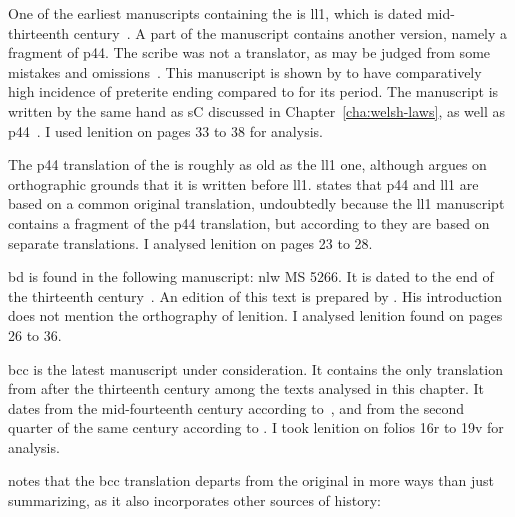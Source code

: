 One of the earliest manuscripts containing the  is \gls{ll1}, which
is dated mid-thirteenth century~\autocite[179]{huws_medieval_2000}.  A part of
the manuscript contains another version, namely a fragment
of \gls{p44}. The scribe was not a translator, as may be judged from
some mistakes and omissions~\autocite[xxxvii]{roberts_brut_1971}. This manuscript is shown by \textcite[80--81]{Rod_Datable98} to have comparatively high incidence of preterite ending  compared to  for its period.
The manuscript is written by the same hand as \gls{sC} discussed in Chapter~\ref{cha:welsh-laws}, as well as  \gls{p44}~\autocite[179]{huws_medieval_2000}.
I used lenition on pages 33 to 38 for analysis.

The \gls{p44} translation of the  is roughly as old as the \gls{ll1} one, although \textcite[85]{Rus_Orthography93} argues on orthographic grounds that it is written before \gls{ll1}. 
\Textcite[xix]{Lew_Brut42} states that \gls{p44} and \gls{ll1} are based on a common original translation, undoubtedly because the \gls{ll1} manuscript contains a fragment of the \gls{p44} translation, but according to \textcite[xliii--xliv]{Rob_Astudiaeth69}  they are based on separate translations.
I analysed lenition on pages 23 to 28.

\Gls{bd} is found in the following manuscript: \gls{nlw} MS 5266.
It is dated to the end of the thirteenth century~\autocite[xliii]{Rob_Astudiaeth69}.
An edition of this text is prepared by \textcite{Lew_Brut42}.
His introduction does not mention the orthography of lenition.
I analysed lenition found on pages 26 to 36.

\Gls{bcc} is the latest manuscript under consideration.
It contains the only translation from after the thirteenth century among the texts analysed in this chapter.
It dates from the mid-fourteenth century according to~\textcite[xlv]{Rob_Astudiaeth69}, and from the second quarter of the same century according to \textcite[xviii]{Jon_Brenhinedd71}.
I took lenition on folios 16r to 19v for analysis.

\Textcite{Rob_Testunau74} notes that the \gls{bcc} translation departs from the original in more ways than just summarizing, as it also incorporates other sources of history:

